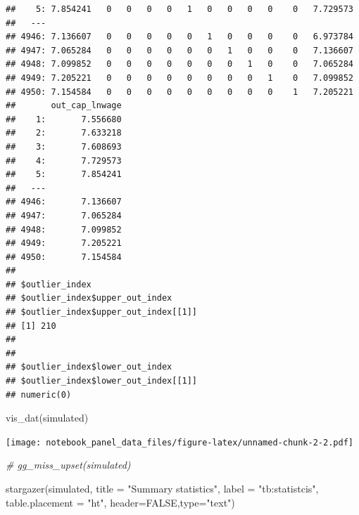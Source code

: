 \documentclass[
]{article}
\newenvironment{Shaded}{\begin{snugshade}}{\end{snugshade}}
\newcommand{\AttributeTok}[1]{\textcolor[rgb]{0.77,0.63,0.00}{#1}}
\newcommand{\CommentTok}[1]{\textcolor[rgb]{0.56,0.35,0.01}{\textit{#1}}}
\newcommand{\ConstantTok}[1]{\textcolor[rgb]{0.00,0.00,0.00}{#1}}
\newcommand{\FunctionTok}[1]{\textcolor[rgb]{0.00,0.00,0.00}{#1}}
\newcommand{\NormalTok}[1]{#1}
\newcommand{\StringTok}[1]{\textcolor[rgb]{0.31,0.60,0.02}{#1}}
\begin{document}
\begin{verbatim}
##    5: 7.854241   0   0   0   0   1   0   0   0   0    0   7.729573
##   ---                                                             
## 4946: 7.136607   0   0   0   0   0   1   0   0   0    0   6.973784
## 4947: 7.065284   0   0   0   0   0   0   1   0   0    0   7.136607
## 4948: 7.099852   0   0   0   0   0   0   0   1   0    0   7.065284
## 4949: 7.205221   0   0   0   0   0   0   0   0   1    0   7.099852
## 4950: 7.154584   0   0   0   0   0   0   0   0   0    1   7.205221
##       out_cap_lnwage
##    1:       7.556680
##    2:       7.633218
##    3:       7.608693
##    4:       7.729573
##    5:       7.854241
##   ---               
## 4946:       7.136607
## 4947:       7.065284
## 4948:       7.099852
## 4949:       7.205221
## 4950:       7.154584
## 
## $outlier_index
## $outlier_index$upper_out_index
## $outlier_index$upper_out_index[[1]]
## [1] 210
## 
## 
## $outlier_index$lower_out_index
## $outlier_index$lower_out_index[[1]]
## numeric(0)
\end{verbatim}

\begin{Shaded}
\begin{Highlighting}[]
  \FunctionTok{vis\_dat}\NormalTok{(simulated)}
\end{Highlighting}
\end{Shaded}

\texttt{[image: notebook\_panel\_data\_files/figure-latex/unnamed-chunk-2-2.pdf]}

\begin{Shaded}
\begin{Highlighting}[]
\CommentTok{\# gg\_miss\_upset(simulated)}

  \FunctionTok{stargazer}\NormalTok{(simulated,}
            \AttributeTok{title =} \StringTok{"Summary statistics"}\NormalTok{,}
            \AttributeTok{label =} \StringTok{"tb:statistcis"}\NormalTok{,}
            \AttributeTok{table.placement =} \StringTok{"ht"}\NormalTok{,}
            \AttributeTok{header=}\ConstantTok{FALSE}\NormalTok{,}\AttributeTok{type=}\StringTok{"text"}\NormalTok{)}
\end{Highlighting}
\end{Shaded}
\end{document}
